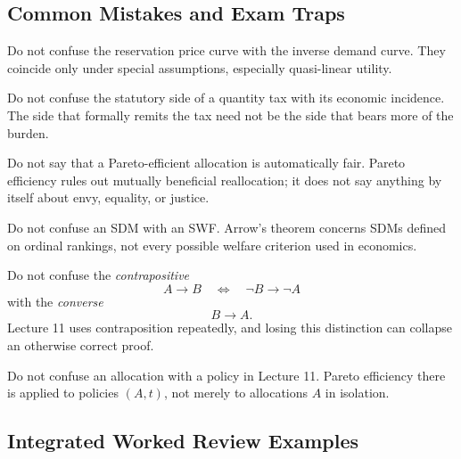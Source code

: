 \subsection{Common Mistakes and Exam Traps}

\begin{commonmistake}
Do not confuse the reservation price curve with the inverse demand curve. They coincide only under special assumptions, especially quasi-linear utility.
\end{commonmistake}

\begin{commonmistake}
Do not confuse the statutory side of a quantity tax with its economic incidence. The side that formally remits the tax need not be the side that bears more of the burden.
\end{commonmistake}

\begin{commonmistake}
Do not say that a Pareto-efficient allocation is automatically fair. Pareto efficiency rules out mutually beneficial reallocation; it does not say anything by itself about envy, equality, or justice.
\end{commonmistake}

\begin{commonmistake}
Do not confuse an SDM with an SWF. Arrow's theorem concerns SDMs defined on ordinal rankings, not every possible welfare criterion used in economics.
\end{commonmistake}

\begin{commonmistake}
Do not confuse the \emph{contrapositive}
\[
A \to B
\quad \Longleftrightarrow \quad
\neg B \to \neg A
\]
with the \emph{converse}
\[
B \to A.
\]
Lecture 11 uses contraposition repeatedly, and losing this distinction can collapse an otherwise correct proof.
\end{commonmistake}

\begin{commonmistake}
Do not confuse an allocation with a policy in Lecture 11. Pareto efficiency there is applied to policies \((A,t)\), not merely to allocations \(A\) in isolation.
\end{commonmistake}

\subsection{Integrated Worked Review Examples}

